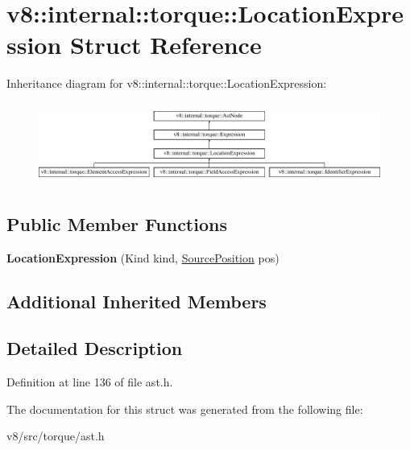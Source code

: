 \hypertarget{structv8_1_1internal_1_1torque_1_1LocationExpression}{}\section{v8\+:\+:internal\+:\+:torque\+:\+:Location\+Expression Struct Reference}
\label{structv8_1_1internal_1_1torque_1_1LocationExpression}
Inheritance diagram for v8\+:\+:internal\+:\+:torque\+:\+:Location\+Expression\+:\begin{figure}[H]
\begin{center}
\leavevmode
\includegraphics[height=2.695548cm]{structv8_1_1internal_1_1torque_1_1LocationExpression}
\end{center}
\end{figure}
\subsection*{Public Member Functions}
\begin{DoxyCompactItemize}
\item 
\mbox{\label{structv8_1_1internal_1_1torque_1_1LocationExpression_a97583e8b90dd7331efadb04834ce4de6}} 
{\bfseries Location\+Expression} (Kind kind, \mbox{\hyperlink{structv8_1_1internal_1_1torque_1_1SourcePosition}{Source\+Position}} pos)
\end{DoxyCompactItemize}
\subsection*{Additional Inherited Members}


\subsection{Detailed Description}


Definition at line 136 of file ast.\+h.



The documentation for this struct was generated from the following file\+:\begin{DoxyCompactItemize}
\item 
v8/src/torque/ast.\+h\end{DoxyCompactItemize}
